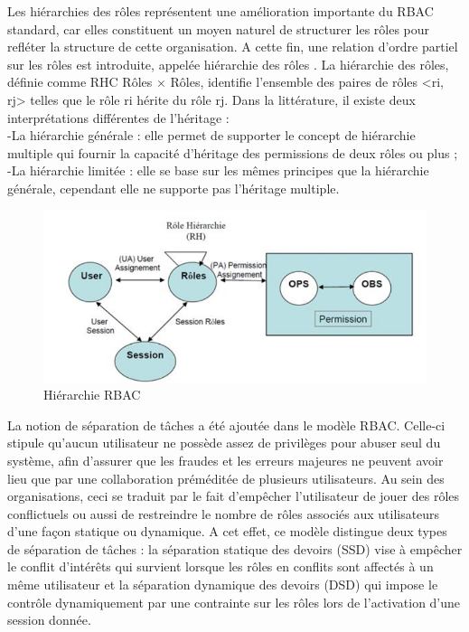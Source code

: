 \label{sectionHiérarchieRole}

Les hiérarchies des rôles représentent une amélioration importante du RBAC standard, car elles constituent un moyen naturel de structurer les rôles pour refléter la structure de cette organisation. A cette fin, une relation d'ordre partiel sur les rôles est introduite, appelée hiérarchie des rôles \cite{theseBenoit}. La hiérarchie des rôles, définie comme RHC Rôles × Rôles, identifie l'ensemble des paires de rôles <ri, rj> telles que le rôle ri  hérite du rôle rj. Dans la littérature, il existe deux interprétations différentes de l'héritage :\\
-La hiérarchie générale : elle permet de supporter le concept de hiérarchie multiple qui fournir la capacité d'héritage des permissions de deux rôles ou plus ;\\
-La hiérarchie limitée : elle se base sur les mêmes principes que la hiérarchie générale, cependant elle ne supporte pas l'héritage multiple.

\begin{figure}[h!]
    \centering
		\includegraphics[scale=0.7]{chap2/images/HierachieRole.png}
    \caption{Hiérarchie RBAC}
	 \label{figHrbac}
\end{figure}

\label{sectionSéparationTache}

La notion de séparation de tâches a été ajoutée dans le modèle RBAC. Celle-ci stipule qu'aucun utilisateur ne possède assez de privilèges pour abuser seul du système, afin d'assurer que les fraudes et les erreurs majeures ne peuvent avoir lieu que par une collaboration préméditée de plusieurs utilisateurs. Au sein des organisations, ceci se traduit par le fait d'empêcher l'utilisateur de jouer des rôles conflictuels ou aussi de restreindre le nombre de rôles associés aux utilisateurs d'une façon statique ou dynamique. A cet effet, ce modèle distingue deux types de séparation de tâches \cite{sandhu96} : la séparation statique des devoirs (SSD) vise à empêcher le conflit d'intérêts qui survient lorsque les rôles en conflits sont affectés à un même utilisateur et la séparation dynamique des devoirs (DSD) qui impose le contrôle dynamiquement par une contrainte sur les rôles lors de l'activation d'une session donnée.


